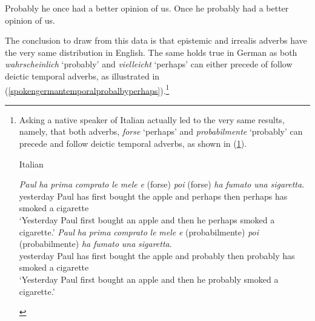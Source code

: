 \begin{exe}
\ex\label{cinuqeenglishdatairrealiscc}\begin{xlist}
\ex Probably he once had a better opinion of us.
\ex Once he probably had a better opinion of us.
\end{xlist}
\end{exe}

\noindent The conclusion to draw from this data is that epistemic and irrealis adverbs have the very same distribution in English. The same holds true in German as both \textit{wahrscheinlich} `probably' and \textit{vielleicht} `perhaps' can either precede of follow deictic temporal adverbs, as illustrated in (\ref{spokengermantemporalprobalbyperhaps}).\footnote{ Asking a native speaker of Italian actually led to the very same results, namely, that both adverbs, \textit{forse} `perhaps' and \textit{probabilmente} `probably' can precede and follow deictic temporal adverbs, as shown in (\ref{italianforseperhaps}).

\begin{exe}
\ex Italian \label{italianforseperhaps}\begin{xlist} 
\ex {} {\textit{Paul}} {\textit{ha}} {\textit{prima}} {\textit{comprato}} {\textit{le}} {\textit{mele}} {\textit{e}} {(forse)} {\textit{poi}} {(forse)} {\textit{ha}} {\textit{fumato}} {\textit{una}} {\textit{sigaretta}}.\\
{yesterday} {Paul} {has} {first} {bought} {the} {apple} {and} {perhaps} {then} {perhaps} {has} {smoked} {a} {cigarette}\\ 
\trans `Yesterday Paul first bought an apple and then he perhaps smoked a cigarette.' \label{italianforseperhapsa}
\ex {} {\textit{Paul}} {\textit{ha}} {\textit{prima}} {\textit{comprato}} {\textit{le}} {\textit{mele}} {\textit{e}} {(probabilmente)} {\textit{poi}} {(probabilmente)} {\textit{ha}} {\textit{fumato}} {\textit{una}} {\textit{sigaretta}}.\\
{yesterday} {Paul} {has} {first} {bought} {the} {apple} {and} {probably} {then} {probably} {has} {smoked} {a} {cigarette}\\ 
\trans `Yesterday Paul first bought an apple and then he probably smoked a cigarette.' \label{italianforseperhapsa}

\end{xlist}
\end{exe}

}

